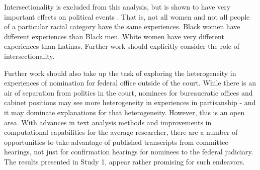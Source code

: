 \documentclass [12pt]{article}
\begin{document}
Intersectionality is excluded from this analysis, but is shown to have very important effects on political events \citep[see][]{phillips_2020_oxford}. That is, not all women and not all people of a particular racial category have the same experiences. Black women have different experiences than Black men. White women have very different experiences than Latinas. Further work should explicitly consider the role of intersectionality.

Further work should also take up the task of exploring the heterogeneity in experiences of nomination for federal office outside of the court. While there is an air of separation from politics in the court, nominees for bureaucratic offices and cabinet positions may see more heterogeneity in experiences in partisanship - and it may dominate explanations for that heterogeneity. However, this is an open area. With advances in text analysis methods and improvements in computational capabilities for the average researcher, there are a number of opportunities to take advantage of published transcripts from committee hearings, not just for confirmation hearings for nominees to the federal judiciary. The results presented in Study 1, appear rather promising for such endeavors.


\newpage


\end{document}
